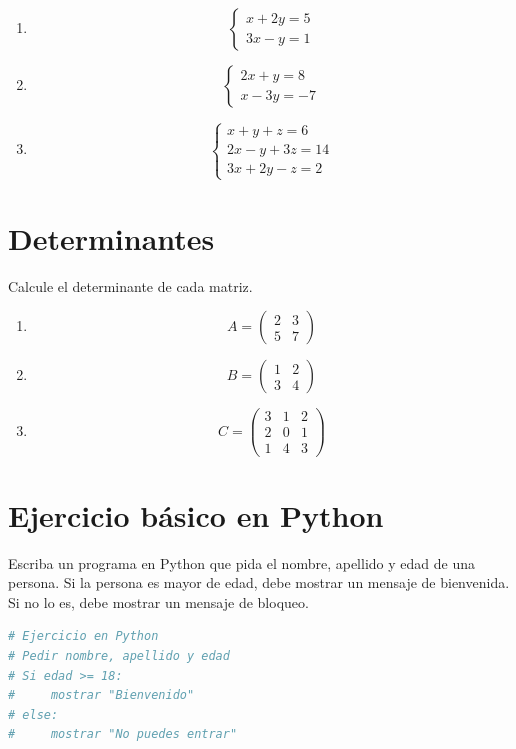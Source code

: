 \documentclass[12pt,a4paper]{article}
\begin{document}
\begin{enumerate}
    \item
    \[
    \begin{cases}
    x + 2y = 5 \\
    3x - y = 1
    \end{cases}
    \]

    \item
    \[
    \begin{cases}
    2x + y = 8 \\
    x - 3y = -7
    \end{cases}
    \]

    \item
    \[
    \begin{cases}
    x + y + z = 6 \\
    2x - y + 3z = 14 \\
    3x + 2y - z = 2
    \end{cases}
    \]
\end{enumerate}

\section{Determinantes}
Calcule el determinante de cada matriz.

\begin{enumerate}
    \item
    \[
    A = \begin{pmatrix}
    2 & 3 \\
    5 & 7
    \end{pmatrix}
    \]

    \item
    \[
    B = \begin{pmatrix}
    1 & 2 \\
    3 & 4
    \end{pmatrix}
    \]

    \item
    \[
    C = \begin{pmatrix}
    3 & 1 & 2 \\
    2 & 0 & 1 \\
    1 & 4 & 3
    \end{pmatrix}
    \]
\end{enumerate}

\section*{Ejercicio básico en Python}
Escriba un programa en Python que pida el nombre, apellido y edad de una persona. Si la persona es mayor de edad, debe mostrar un mensaje de bienvenida. Si no lo es, debe mostrar un mensaje de bloqueo.

\begin{lstlisting}[language=Python]
# Ejercicio en Python
# Pedir nombre, apellido y edad
# Si edad >= 18:
#     mostrar "Bienvenido"
# else:
#     mostrar "No puedes entrar"
\end{lstlisting}
\end{document}
